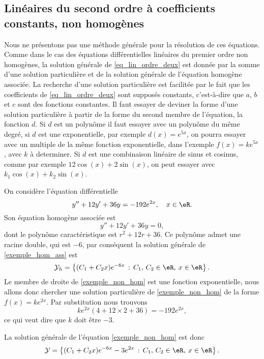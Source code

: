 \subsection{Linéaires du second ordre à coefficients constants, non homogènes}

Nous ne présentons pas une méthode générale pour la résolution de ces équations. Comme dans le cas des équations différentielles linéaires du premier ordre non homogènes, la solution générale de \eqref{eq_lin_ordre_deux} est donnée par la somme d'une solution particulière et de la solution générale de l'équation homogène associée. La recherche d'une solution particulière est facilitée par le fait que les coefficients de \eqref{eq_lin_ordre_deux} sont supposés constants, c'est-à-dire que \( a\), \( b\) et \( c\) sont des fonctions constantes. Il faut essayer de deviner la forme d'une solution particulière à partir de la forme du second membre de l'équation, la fonction \( d\). Si \( d\) est un polynôme il faut essayer avec un polynôme du même degré, si \( d\) est une exponentielle, par exemple \( d(x) = e^{5x}\), on pourra essayer avec un multiple de la m\^eme fonction exponentielle, dans l'exemple \( f(x) = k e^{5x}\), avec \( k\) à determiner. Si \( d\) est une combinaison linéaire de sinus et cosinus, comme par exemple \( 12\cos(x) + 2\sin(x)\), on peut essayer avec \( k_1\cos(x) + k_2\sin(x)\).

\begin{example}
	On considère l'équation différentielle
	\begin{equation}\label{exemple_non_hom}
		y'' + 12y' + 36 y = -192 e^{2x}, \quad x\in\eR.
	\end{equation}
	Son équation homogène associée est
	\begin{equation}\label{exemple_hom_ass}
		y'' + 12y' + 36 y = 0,
	\end{equation}
	dont le polynôme caractéristique est \( r^2 + 12 r + 36\). Ce polynôme admet une racine double, qui est \( -6\), par conséquent la solution générale de \eqref{exemple_hom_ass} est
	\begin{equation*}
		\mathcal{Y}_h  = \left\{(C_1  +C_2x) e^{-6 x} \,:\, C_1,\, C_2 \in \eR, \: x\in \eR\right\}.
	\end{equation*}
	Le membre de droite de \eqref{exemple_non_hom} est une fonction exponentielle, nous allons donc chercher une solution particulière de \eqref{exemple_non_hom} de la forme \( f(x) = ke^{2x}\). Par substitution nous trouvons
	\[
		ke^{2x}(4 + 12 \times 2 +36) = -192 e^{2x},
	\]
	ce qui veut dire que \( k\) doit \^etre \( -3\).

	La solution générale de l'équation \eqref{exemple_non_hom} est donc
	\begin{equation*}
		\mathcal{Y}  = \left\{(C_1  +C_2x) e^{-6 x} -3e^{2x} \,:\, C_1,\, C_2 \in \eR, \: x\in \eR\right\}.
	\end{equation*}
\end{example}

